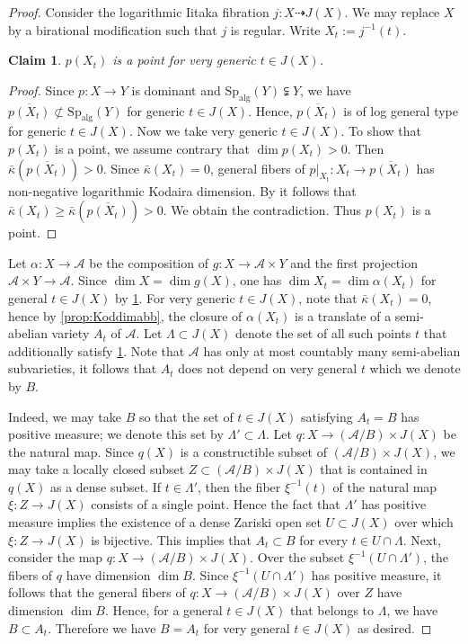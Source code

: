 \documentclass[11pt,english]{smfart}
\theoremstyle{plain}
\newtheorem{claim}[thm]{Claim}
\theoremstyle{definition}
\theoremstyle{remark}
\numberwithin{equation}{subsection}
\theoremstyle{plain}
\newcommand{\cA}{\mathcal A}
\newcommand{\Spalg}{\mathrm{Sp}_{\mathrm{alg}}}
\begin{document}
\begin{proof}
Consider the logarithmic Iitaka fibration $j: X\dashrightarrow J(X)$. We may replace $X$ by a birational modification such that $j$ is regular.    
Write $X_t:=j^{-1}(t)$.  



\begin{claim}\label{claim:20230518}
 $p(X_t)$ is a point for very generic $t\in J(X)$.
 \end{claim}
 
 \begin{proof}
Since $p:X\to Y$ is dominant and $\Spalg(Y)\subsetneqq Y$, we have $\overline{p(X_t)}\not\subset \Spalg(Y)$ for generic $t\in J(X)$.
Hence, $\overline{p(X_t)}$ is of log general type for generic $t\in J(X)$.
Now we take very generic $t\in J(X)$.
To show that $p(X_t)$ is a point, we assume contrary that $\dim p(X_t)>0$.
Then $\bar{\kappa}(\overline{p(X_t)})>0$.
Since $\bar{\kappa}(X_t)=0$, general fibers of $p|_{X_t}:X_t\to \overline{p(X_t)}$ has  non-negative logarithmic Kodaira dimension.  By \cite[Theorem 1.9]{Fuj17} it follows that $\bar{\kappa}(X_t)\geq \bar{\kappa}(\overline{p(X_t)})>0$. We obtain the  contradiction. 
Thus $p(X_t)$ is a point. 
\end{proof}




Let $\alpha:X\to \cA$ be the composition of $g:X\to \cA\times Y$ and the first projection $\cA\times Y\to \cA$.
	Since $\dim X=\dim g(X)$,  one has $\dim X_t=\dim \alpha(X_t)$ for general $t\in J(X)$ by \cref{claim:20230518}.		
	For very generic $t\in J(X)$, note that $\bar{\kappa}(X_t)=0$, hence by \cref{prop:Koddimabb}, the closure of $\alpha(X_t)$ is a translate of a  semi-abelian variety $A_t$  of $\cA$.  
Let $\Lambda \subset J(X)$ denote the set of all such points $t$ that additionally satisfy \cref{claim:20230518}.
	Note that $\cA$ has only at most countably many  semi-abelian subvarieties, it follows that $A_t$ does not depend on very general $t$ which we denote by $B$.  
	
	
Indeed, we may take $B$ so that the set of $t \in J(X)$ satisfying $A_t = B$ has positive measure; we denote this set by $\Lambda' \subset \Lambda$.
	Let $q:X\to (\cA/B)\times J(X)$ be the natural map.
	Since $q(X)$ is a constructible subset of $(\mathcal{A}/B) \times J(X)$, we may take a locally closed subset $Z \subset (\mathcal{A}/B) \times J(X)$ that is contained in $q(X)$ as a dense subset.
	If $t \in \Lambda'$, then the fiber $\xi^{-1}(t)$ of the natural map $\xi: Z \to J(X)$ consists of a single point.
	Hence the fact that $\Lambda'$ has positive measure implies the existence of a dense Zariski open set $U \subset J(X)$ over which $\xi: Z \to J(X)$ is bijective.
	This implies that $A_t\subset B$ for every $t\in U\cap\Lambda$.
Next, consider the map $q: X \to (\mathcal{A}/B) \times J(X)$. 
Over the subset $\xi^{-1}(U \cap \Lambda')$, the fibers of $q$ have dimension $\dim B$.
Since $\xi^{-1}(U \cap \Lambda')$ has positive measure, it follows that the general fibers of $q: X \to (\mathcal{A}/B) \times J(X)$ over $Z$ have dimension $\dim B$.
Hence, for a general $t \in J(X)$ that belongs to $\Lambda$, we have $B \subset A_t$.
Therefore we have $B=A_t$ for very general $t\in J(X)$ as desired.


\end{proof}
\end{document}
